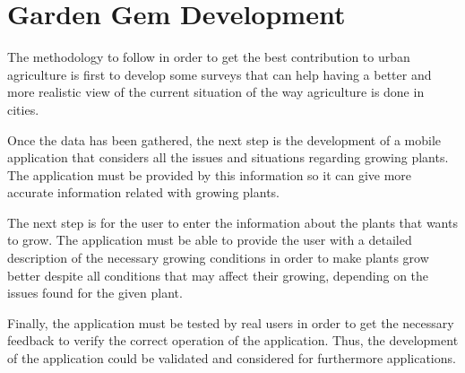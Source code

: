 \section{Garden Gem Development}

The methodology to follow in order to get the best contribution to urban agriculture is first to develop some surveys that can help having a better and more realistic view of the current situation of the way agriculture is done in cities. 

Once the data has been gathered, the next step is the development of a mobile application that considers all the issues and situations regarding growing plants. The application must be provided by this information so it can give more accurate information related with growing plants.

The next step is for the user to enter the information about the plants that wants to grow. The application must be able to provide the user with a detailed description of the necessary growing conditions in order to make plants grow better despite all conditions that may affect their growing, depending on the issues found for the given plant.

Finally, the application must be tested by real users in order to get the necessary feedback to verify the correct operation of the application. Thus, the development of the application could be validated and considered for furthermore applications.


